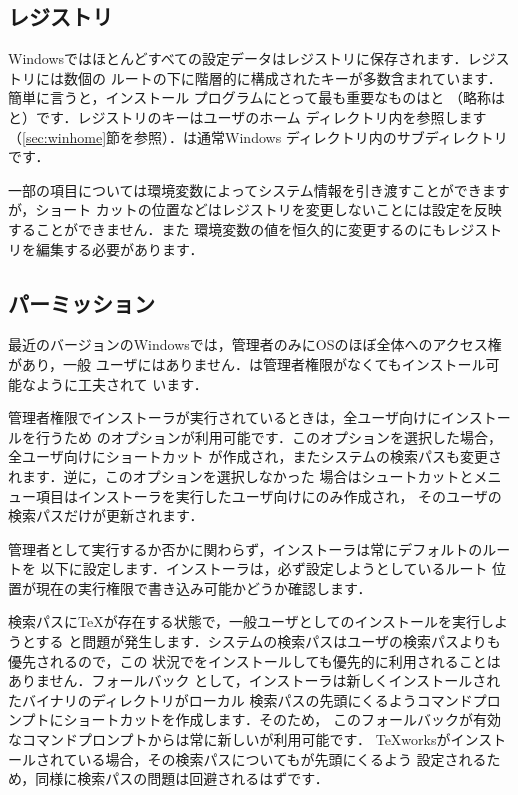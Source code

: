 \documentclass[uplatex,dvipdfmx,tombow]{jsarticle}
\begin{document}
\subsection{レジストリ}
\label{sec:registry}

Windowsではほとんどすべての設定データはレジストリに保存されます．レジストリには数個の
ルートの下に階層的に構成されたキーが多数含まれています．簡単に言うと，インストール
プログラムにとって最も重要なものはと%
（略称はと）です．レジストリのキーはユーザのホーム
ディレクトリ内を参照します（\ref{sec:winhome}節を参照）．は通常Windows%
ディレクトリ内のサブディレクトリです．

一部の項目については環境変数によってシステム情報を引き渡すことができますが，ショート
カットの位置などはレジストリを変更しないことには設定を反映することができません．また
環境変数の値を恒久的に変更するのにもレジストリを編集する必要があります．

\subsection{パーミッション}
\label{sec:winpermissions}

最近のバージョンのWindowsでは，管理者のみにOSのほぼ全体へのアクセス権があり，一般
ユーザにはありません．\TL は管理者権限がなくてもインストール可能なように工夫されて
います．

管理者権限でインストーラが実行されているときは，全ユーザ向けにインストールを行うため
のオプションが利用可能です．このオプションを選択した場合，全ユーザ向けにショートカット
が作成され，またシステムの検索パスも変更されます．逆に，このオプションを選択しなかった
場合はシュートカットとメニュー項目はインストーラを実行したユーザ向けにのみ作成され，
そのユーザの検索パスだけが更新されます．

管理者として実行するか否かに関わらず，インストーラは常にデフォルトの\TL ルートを
以下に設定します．インストーラは，必ず設定しようとしているルート
位置が現在の実行権限で書き込み可能かどうか確認します．

検索パスに\TeX が存在する状態で，一般ユーザとして\TL のインストールを実行しようとする
と問題が発生します．システムの検索パスはユーザの検索パスよりも優先されるので，この
状況で\TL をインストールしても優先的に利用されることはありません．フォールバック
として，インストーラは新しくインストールされた\TL バイナリのディレクトリがローカル
検索パスの先頭にくるようコマンドプロンプトにショートカットを作成します．そのため，
このフォールバックが有効なコマンドプロンプトからは常に新しい\TL が利用可能です．
\TeX worksがインストールされている場合，その検索パスについても\TL が先頭にくるよう
設定されるため，同様に検索パスの問題は回避されるはずです．
\end{document}
